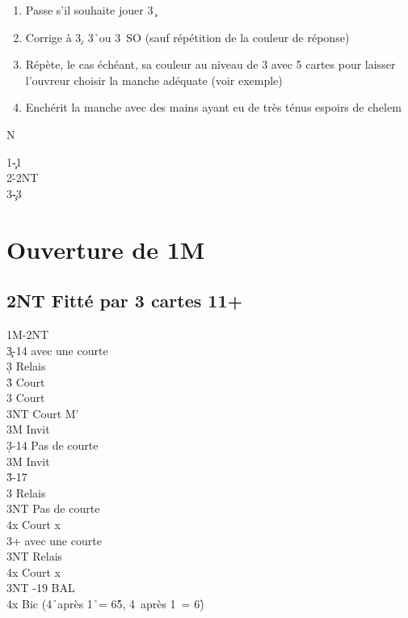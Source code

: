 \documentclass[a4paper]{article}
\begin{document}
\begin{enumerate}
\item Passe s'il souhaite jouer 3\c\ 

\item Corrige à 3\d , 3\h\ ou 3\s\ SO (sauf répétition de la couleur de réponse)

\item Répète, le cas échéant, sa couleur au niveau de 3 avec 5 cartes pour laisser l'ouvreur choisir la manche adéquate (voir exemple)

\item Enchérit la manche avec des mains ayant eu de très ténus espoirs de chelem

\end{enumerate}

\dealdiagramenw
{}
{}
{}
{N}

\begin{bidtable}
1\c-1\s\\
2\h-2NT\\
3\c-3\s
\end{bidtable}

\section{Ouverture de 1M}

\subsection{2NT Fitté par 3 cartes 11+}

\begin{bidtable}
1M-2NT\\
3\c {}-14 avec une courte\+\\
3\d \> Relais\+\\
3\h \> Court \c \\
3\s \> Court \d \\
3NT \> Court M'\-\\
3M \> Invit\-\\
3\d {}-14 Pas de courte\+\\
3M \> Invit\-\\
3\h {}-17\+\\
3\s \> Relais\+\\
3NT \> Pas de courte\\
4x \> Court x\-\-\\
3\s {}+ avec une courte\+\\
3NT \> Relais\+\\
4x \> Court x\-\-\\
3NT -19 BAL\\
4x \> Bic (4\h\ après 1\h\ = 6\h 5\s , 4\s\ après 1\s\ = 6\h )
\end{bidtable}
\end{document}
